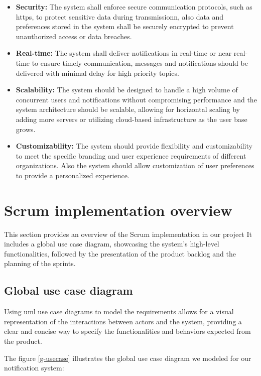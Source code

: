 \begin{itemize}
      \item \textbf{Security:} The system shall enforce secure communication protocols, such as \acrshort{https},
            to protect sensitive data during transmissionn, also data and preferences stored in the system shall be securely
            encrypted to prevent unauthorized access or data breaches.
      \item \textbf{Real-time:} The system shall deliver notifications in real-time or near real-time
            to ensure timely communication, messages and notifications should be delivered with minimal delay for high
            priority topics.
      \item \textbf{Scalability:} The system should be designed to handle a high volume of concurrent users
            and notifications without compromising performance and the system architecture should be scalable, allowing for
            horizontal scaling by adding more servers or utilizing cloud-based infrastructure as the user base grows.
      \item \textbf{Customizability:} The system should provide flexibility and customizability to meet
            the specific branding and user experience requirements of different organizations. Also the system should
            allow customization of user preferences to provide a personalized experience.
\end{itemize}

\section{Scrum implementation overview}
\label{spec}
This section provides an overview of the Scrum implementation in our project It includes a global use case diagram, showcasing the system's
high-level functionalities, followed by the presentation of the product backlog and the planning
of the sprints.

\subsection{Global use case diagram}
Using \acrshort{uml} use case diagrams to model the requirements allows for a visual representation
of the interactions between actors and the system, providing a clear and concise way to specify
the functionalities and behaviors expected from the product.

The figure \ref{g-usecase} illustrates the global use case diagram we modeled for our notification system: \\

